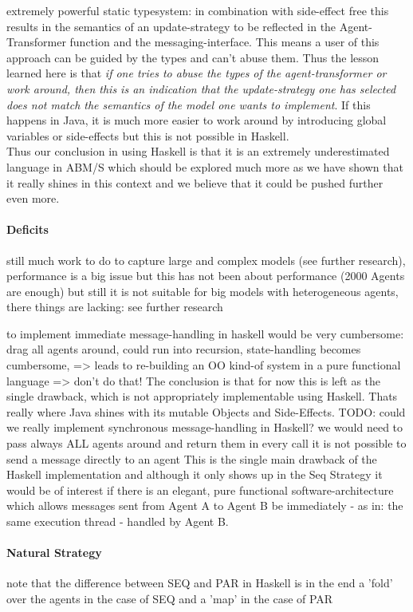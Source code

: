 extremely powerful static typesystem: in combination with side-effect free this results in the semantics of an update-strategy to be reflected in the Agent-Transformer function and the messaging-interface. This means a user of this approach can be guided by the types and can't abuse them. Thus the lesson learned here is that \textit{if one tries to abuse the types of the agent-transformer or work around, then this is an indication that the update-strategy one has selected does not match the semantics of the model one wants to implement}. If this happens in Java, it is much more easier to work around by introducing global variables or side-effects but this is not possible in Haskell. \\
Thus our conclusion in using Haskell is that it is an extremely underestimated language in ABM/S which should be explored much more as we have shown that it really shines in this context and we believe that it could be pushed further even more.

\paragraph{Deficits}
still much work to do to capture large and complex models (see further research), performance is a big issue but this has not been about performance (2000 Agents are enough)
but still it is not suitable for big models with heterogeneous agents, there things are lacking: see further research

to implement immediate message-handling in haskell would be very cumbersome: 
drag all agents around, could run into recursion, state-handling becomes cumbersome, => leads to re-building an OO kind-of system in a pure functional language => don't do that! The conclusion is that for now this is left as the single drawback, which is not appropriately implementable using Haskell. Thats really where Java shines with its mutable Objects and Side-Effects.
TODO: could we really implement synchronous message-handling in Haskell? we would need to pass always ALL agents around and return them in every call
it is not possible to send a message directly to an agent
This is the single main drawback of the Haskell implementation and although it only shows up in the Seq Strategy it would be of interest if there is an elegant, pure functional software-architecture which allows messages sent from Agent A to Agent B be immediately - as in: the same execution thread - handled by Agent B. 

\paragraph{Natural Strategy}
note that the difference between SEQ and PAR in Haskell is in the end a 'fold' over the agents in the case of SEQ and a 'map' in the case of PAR




